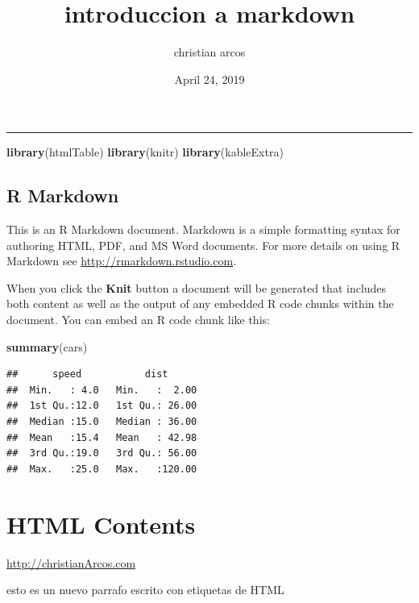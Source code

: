\documentclass[]{article}
\title{introduccion a markdown}
\author{christian arcos}
\date{April 24, 2019}
\newenvironment{Shaded}{\begin{snugshade}}{\end{snugshade}}
\newcommand{\KeywordTok}[1]{\textcolor[rgb]{0.13,0.29,0.53}{\textbf{#1}}}
\newcommand{\NormalTok}[1]{#1}
\begin{document}
\maketitle

\begin{center}\rule{0.5\linewidth}{\linethickness}\end{center}

\begin{Shaded}
\begin{Highlighting}[]
\KeywordTok{library}\NormalTok{(htmlTable)}
\KeywordTok{library}\NormalTok{(knitr)}
\KeywordTok{library}\NormalTok{(kableExtra)}
\end{Highlighting}
\end{Shaded}

\subsection{R Markdown}\label{r-markdown}

This is an R Markdown document. Markdown is a simple formatting syntax
for authoring HTML, PDF, and MS Word documents. For more details on
using R Markdown see \url{http://rmarkdown.rstudio.com}.

When you click the \textbf{Knit} button a document will be generated
that includes both content as well as the output of any embedded R code
chunks within the document. You can embed an R code chunk like this:

\begin{Shaded}
\begin{Highlighting}[]
\KeywordTok{summary}\NormalTok{(cars)}
\end{Highlighting}
\end{Shaded}

\begin{verbatim}
##      speed           dist       
##  Min.   : 4.0   Min.   :  2.00  
##  1st Qu.:12.0   1st Qu.: 26.00  
##  Median :15.0   Median : 36.00  
##  Mean   :15.4   Mean   : 42.98  
##  3rd Qu.:19.0   3rd Qu.: 56.00  
##  Max.   :25.0   Max.   :120.00
\end{verbatim}

\section{HTML Contents}\label{html-contents}

\url{http://christianArcos.com}

esto es un nuevo parrafo escrito con etiquetas de HTML
\end{document}

